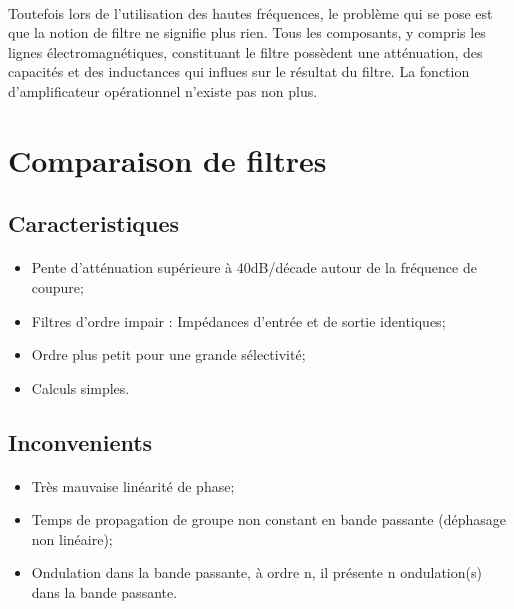 \documentclass[a4paper,11pt]{article}
\begin{document}
    \paragraph{}
Toutefois lors de l’utilisation des hautes fréquences, le problème qui se pose est que la notion de filtre ne signifie plus rien.
Tous les composants, y compris les lignes électromagnétiques, constituant le filtre possèdent une atténuation, des capacités et des inductances qui influes sur le résultat du filtre.
La fonction d’amplificateur opérationnel n’existe pas non plus.

    \clearpage


\section{Comparaison de filtres}
    \subsection{Caracteristiques}
        \paragraph{}
        \begin{itemize}
            \item Pente d’atténuation supérieure à 40dB/décade autour de la fréquence de coupure;
            \item Filtres d’ordre impair : Impédances d’entrée et de sortie identiques;
            \item Ordre plus petit pour une grande sélectivité;
            \item Calculs simples.
        \end{itemize}

    \subsection{Inconvenients}
        \paragraph{}
        \begin{itemize}
            \item Très mauvaise linéarité de phase;
            \item Temps de propagation de groupe non constant en bande passante (déphasage non linéaire);
            \item Ondulation dans la bande passante, à ordre n, il présente n ondulation(s) dans la bande passante.
        \end{itemize}
\end{document}
